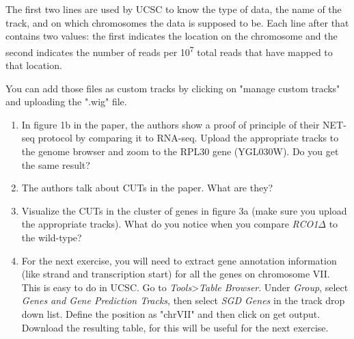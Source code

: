 \documentclass[a4paper,11pt]{article}
\begin{document}
The first two lines are used by UCSC to know the type of data, the name of the track, and on which chromosomes the data is supposed to be. Each line after that contains two values: the first indicates the location on the chromosome and the second indicates the number of reads per 10\textsuperscript{7} total reads that have mapped to that location.

You can add those files as custom tracks by clicking on "manage custom tracks" and uploading the ".wig" file.
\begin{enumerate}
\item In figure 1b in the paper, the authors show a proof of principle of their NET-seq protocol by comparing it to RNA-seq. Upload the appropriate tracks to the genome browser and zoom to the RPL30 gene (YGL030W). Do you get the same result?
\item The authors talk about CUTs in the paper. What are they?
\item Visualize the CUTs in the cluster of genes in figure 3a (make sure you upload the appropriate tracks). What do you notice when you compare \textit{RCO1$\Delta$} to the wild-type?
\item For the next exercise, you will need to extract gene annotation information (like strand and transcription start) for all the genes on chromosome VII. This is easy to do in UCSC. Go to \textit{Tools}>\textit{Table Browser}. Under \textit{Group}, select \textit{Genes and Gene Prediction Tracks}, then select \textit{SGD Genes} in the track drop down list. Define the position as "chrVII" and then click on get output. Download the resulting table, for this will be useful for the next exercise.
\end{enumerate}
\end{document}
